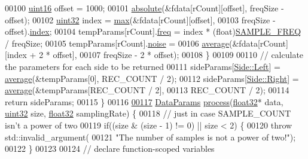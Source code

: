 \begin{DoxyCode}
00100             \hyperlink{definitions_8hpp_a05f6b0ae8f6a6e135b0e290c25fe0e4e}{uint16} offset = 1000;
00101             \hyperlink{namespacevaso_a6ca90add966ce1773fc59a6883e6cd0c}{absolute}(&fdata[rCount][offset],    freqSize - offset);
00102             \hyperlink{definitions_8hpp_a1134b580f8da4de94ca6b1de4d37975e}{uint32} index = \hyperlink{namespacevaso_a122846d728be312454a452d379915e10}{max}(&fdata[rCount][offset],
00103                     freqSize - offset).\hyperlink{structMaximum_a2e6aef03795cd285fe542d0861c6e3b5}{index};
00104             tempParams[rCount].\hyperlink{structDataParams_a12566e017407647bc8287d62554ad3fb}{freq} = index * (float)\hyperlink{definitions_8hpp_a9401e43a8c86acafb31c8e2709baefa1}{SAMPLE\_FREQ} / freqSize;
00105             tempParams[rCount].\hyperlink{structDataParams_a4efd1d2231c6fa7c878c9d5e1650738f}{noise} =
00106                 \hyperlink{namespacevaso_ad3205136b1cd04b4c6b9d7be73661796}{average}(&fdata[rCount][index + 2 * offset],
00107                         freqSize - 2 * offset);
00108         \}
00109 
00110         \textcolor{comment}{// calculate the parameters for each side to be returned}
00111         sideParams[\hyperlink{namespacevaso_a77c5d9704657d49d456f691ddd8abf7ca945d5e233cf7d6240f6b783b36a374ff}{Side::Left}] = \hyperlink{namespacevaso_ad3205136b1cd04b4c6b9d7be73661796}{average}(&tempParams[0], REC\_COUNT / 2);
00112         sideParams[\hyperlink{namespacevaso_a77c5d9704657d49d456f691ddd8abf7ca92b09c7c48c520c3c55e497875da437c}{Side::Right}] = \hyperlink{namespacevaso_ad3205136b1cd04b4c6b9d7be73661796}{average}(&tempParams[REC\_COUNT / 2],
00113                 REC\_COUNT / 2);
00114         \textcolor{keywordflow}{return} sideParams;
00115     \}
00116 
\hypertarget{process_8hpp_source_l00117}{}\hyperlink{namespacevaso_a8136a2891983f7a41768330e018e3232}{00117}     \hyperlink{structDataParams}{DataParams} \hyperlink{namespacevaso_a8136a2891983f7a41768330e018e3232}{process}(\hyperlink{definitions_8hpp_aacdc525d6f7bddb3ae95d5c311bd06a1}{float32}* data, \hyperlink{definitions_8hpp_a1134b580f8da4de94ca6b1de4d37975e}{uint32} size, 
      \hyperlink{definitions_8hpp_aacdc525d6f7bddb3ae95d5c311bd06a1}{float32} samplingRate) \{
00118         \textcolor{comment}{// just in case SAMPLE\_COUNT isn't a power of two}
00119         \textcolor{keywordflow}{if}((size & (size - 1) != 0) || size < 2) \{
00120             \textcolor{keywordflow}{throw} std::invalid\_argument(
00121                     \textcolor{stringliteral}{"The number of samples is not a power of two!"});
00122         \}
00123 
00124         \textcolor{comment}{// declare function-scoped variables}

\end{DoxyCode}
